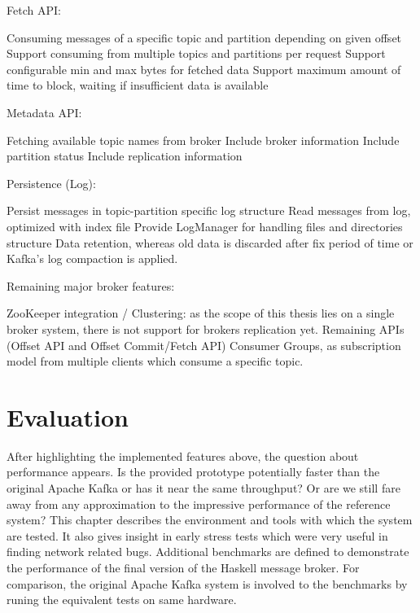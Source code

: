 Fetch API:
\begin{itemize}
        \tick Consuming messages of a specific topic and partition depending on given offset
        \fail Support consuming from multiple topics and partitions per request
        \fail Support configurable min and max bytes for fetched data
        \fail Support maximum amount of time to block, waiting if insufficient
        data is available
\end{itemize}

Metadata API:
\begin{itemize}
        \tick Fetching available topic names from broker
        \tick Include broker information
        \fail Include partition status
        \fail Include replication information
\end{itemize}

Persistence (Log):
\begin{itemize}
        \tick Persist messages in topic-partition specific log structure
        \tick Read messages from log, optimized with index file
        \tick Provide LogManager for handling files and directories structure 
        \fail Data retention, whereas old data is discarded after fix period of
            time or Kafka's log compaction is applied. \end{itemize}
Remaining major broker features:
\begin{itemize}
        \fail ZooKeeper integration / Clustering: as the scope of this thesis lies on a single broker
        system, there is not support for brokers replication yet.
        \fail Remaining APIs (Offset API and Offset Commit/Fetch API)
        \fail Consumer Groups, as subscription model from multiple clients which consume a specific topic.
\end{itemize}

\newpage
\section{Evaluation}
After highlighting the implemented features above, the question about
performance appears. Is the provided prototype potentially faster than the original
Apache Kafka or has it near the same throughput? Or are we still fare away from any
approximation to the impressive performance of the reference system? This
chapter describes the environment and tools with which the system are tested.
It also gives insight in early stress tests which were very useful in finding
network related bugs. Additional benchmarks are defined to demonstrate the
performance of the final version of the Haskell message broker. For comparison, 
the original Apache Kafka system is involved to the benchmarks by runing the
equivalent tests on same hardware.

